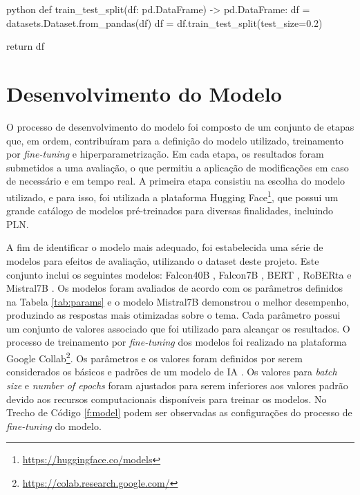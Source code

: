 \begin{code}
\label{f:div}
\begin{mintedbox}{python}
def train_test_split(df: pd.DataFrame) -> pd.DataFrame:
    df = datasets.Dataset.from_pandas(df)
    df = df.train_test_split(test_size=0.2)

    return df
\end{mintedbox}
\end{code}

\section{Desenvolvimento do Modelo}

O processo de desenvolvimento do modelo foi composto de um conjunto de etapas que, em ordem, contribuíram para a definição do modelo utilizado, treinamento por \textit{fine-tuning} e hiperparametrização. Em cada etapa, os resultados foram submetidos a uma avaliação, o que permitiu a aplicação de modificações em caso de necessário e em tempo real. A primeira etapa consistiu na escolha do modelo utilizado, e para isso, foi utilizada a plataforma Hugging Face\footnote{\url{https://huggingface.co/models}}, que possui um grande catálogo de modelos pré-treinados para diversas finalidades, incluindo PLN. 

A fim de identificar o modelo mais adequado, foi estabelecida uma série de modelos para efeitos de avaliação, utilizando o dataset deste projeto. Este conjunto inclui os seguintes modelos: Falcon40B \cite{falcon40b}, Falcon7B \cite{falcon40b}, BERT \cite{bert}, RoBERta \cite{roberta} e Mistral7B \cite{mistral}. Os modelos foram avaliados de acordo com os parâmetros definidos na Tabela \ref{tab:params} e o modelo Mistral7B \cite{mistral} demonstrou o melhor desempenho, produzindo as respostas mais otimizadas sobre o tema. Cada parâmetro possui um conjunto de valores associado que foi utilizado para alcançar os resultados. O processo de treinamento por \textit{fine-tuning} dos modelos foi realizado na plataforma Google Collab\footnote{\url{https://colab.research.google.com/}}. Os parâmetros e os valores foram definidos por serem considerados os básicos e padrões de um modelo de \acrshort{IA} \cite{hyper1, hyper2}. Os valores para \textit{batch size} e \textit{number of epochs} foram ajustados para serem inferiores aos valores padrão devido aos recursos computacionais disponíveis para treinar os modelos. No Trecho de Código \ref{f:model} podem ser observadas as configurações do processo de \textit{fine-tuning} do modelo.

